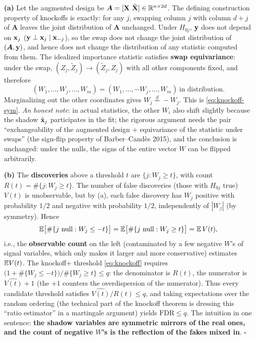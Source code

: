 \begin{description}[style=nextline, itemsep=1.2ex]
\item[Exercise \ref{ex:knockoff} (the exchangeability argument)]
\textbf{(a)} Let the augmented design be $\bm{A} = [\mathbf{X}\ \tilde{\mathbf{X}}] \in \mathbb{R}^{n \times 2d}$. The defining construction property of knockoffs is exactly: for any $j$, swapping column $j$ with column $d+j$ of $\bm{A}$ leaves the joint distribution of $\bm{A}$ unchanged. Under $H_{0j}$, $\mathbf{y}$ does not depend on $\mathbf{x}_j$ ($\mathbf{y} \perp \mathbf{x}_j \mid \mathbf{x}_{-j}$), so the swap does not change the joint distribution of $(\bm{A}, \mathbf{y})$, and hence does not change the distribution of any statistic computed from them. The idealized importance statistic satisfies \textbf{swap equivariance}: under the swap, $(Z_j, \tilde{Z}_j) \to (\tilde{Z}_j, Z_j)$ with all other components fixed, and therefore
\[
  (W_1, \dots, W_j, \dots, W_m)
  = (W_1, \dots, -\!W_j, \dots, W_m) \ \text{in distribution}.
\]
Marginalizing out the other coordinates gives $W_j \overset{d}{=} -W_j$. This is \eqref{eq:knockoff-sym}. \textit{An honest note}: in actual statistics, the other $W_i$ also shift slightly because the shadow $\tilde{\mathbf{x}}_j$ participates in the fit; the rigorous argument needs the pair ``exchangeability of the augmented design $+$ equivariance of the statistic under swaps'' (the sign-flip property of Barber--Cand\`es 2015), and the conclusion is unchanged: under the nulls, the signs of the entire vector $W$ can be flipped arbitrarily.

\textbf{(b)} The \textbf{discoveries} above a threshold $t$ are $\{j : W_j \ge t\}$, with count $R(t) = \#\{j : W_j \ge t\}$. The number of false discoveries (those with $H_{0j}$ true) $V(t)$ is unobservable, but by (a), each false discovery has $W_j$ positive with probability $1/2$ and negative with probability $1/2$, independently of $|W_j|$ (by symmetry). Hence
\[
  \mathbb{E}\big[ \#\{ j \text{ null} : W_j \le -t \} \big]
  = \mathbb{E}\big[ \#\{ j \text{ null} : W_j \ge t \} \big]
  = \mathbb{E}\, V(t),
\]
i.e., the \textbf{observable count} on the left (contaminated by a few negative $W$'s of signal variables, which only makes it larger and more conservative) estimates $\mathbb{E} V(t)$. The knockoff+ threshold \eqref{eq:knockoff} requires $\big(1 + \#\{W_j \le -t\}\big) / \#\{W_j \ge t\} \le q$: the denominator is $R(t)$, the numerator is $\widehat{V(t)} + 1$ (the $+1$ counters the overdispersion of the numerator). Thus every candidate threshold satisfies $\widehat{V(t)}/R(t) \le q$, and taking expectations over the random ordering (the technical part of the knockoff theorem is dressing this ``ratio estimator'' in a martingale argument) yields $\mathrm{FDR} \le q$. The intuition in one sentence: \textbf{the shadow variables are symmetric mirrors of the real ones, and the count of negative $W$'s is the reflection of the fakes mixed in}. $\square$
\end{description}

